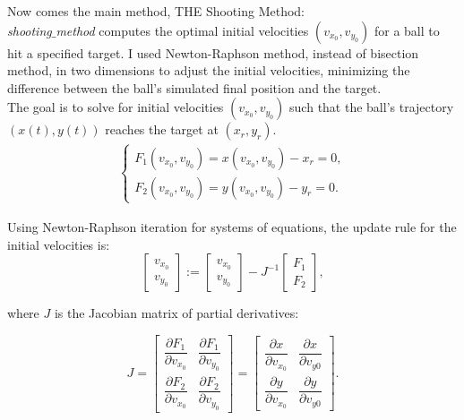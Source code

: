 \documentclass{article}
\begin{document}
	Now comes the main method, THE Shooting Method: \\
	
	\textit{shooting$\_$method} computes the optimal initial velocities $(v_{x_0}, v_{y_0})$ for a ball to hit a specified target. I used Newton-Raphson method, instead of bisection method, in two dimensions to adjust the initial velocities, minimizing the difference between the ball's simulated final position and the target. \\
	
	The goal is to solve for initial velocities $(v_{x_0}, v_{y_0})$ such that the ball's trajectory $(x(t),y(t))$ reaches the target at $(x_r, y_r)$.
	\begin{align*}
		\begin{cases}
			F_1(v_{x_0}, v_{y_0}) = x(v_{x_0}, v_{y_0}) - x_r = 0, \\
			F_2(v_{x_0}, v_{y_0}) = y(v_{x_0}, v_{y_0}) - y_r = 0.
		\end{cases}
	\end{align*}
	
	Using Newton-Raphson iteration for systems of equations, the update rule for the initial velocities is:
	\begin{equation*}
		\begin{bmatrix}
			v_{x_0} \\
			v_{y_0}
		\end{bmatrix}
		:=
		\begin{bmatrix}
			v_{x_0} \\
			v_{y_0}
		\end{bmatrix}
		- J^{-1}
		\begin{bmatrix}
			F_1 \\
			F_2
		\end{bmatrix},
	\end{equation*}
	
	where $J$ is the Jacobian matrix of partial derivatives:
	
	\begin{equation}
		J =
		\begin{bmatrix}
			\dfrac{\partial F_1}{\partial v_{x_0}} & \dfrac{\partial F_1}{\partial v_{y_0}} \\
			\dfrac{\partial F_2}{\partial v_{x_0}} & \dfrac{\partial F_2}{\partial v_{y_0}}
		\end{bmatrix}
		=
		\begin{bmatrix}
			\dfrac{\partial x}{\partial v_{x_0}} & \dfrac{\partial x}{\partial v_{y0}} \\
			\dfrac{\partial y}{\partial v_{x_0}} & \dfrac{\partial y}{\partial v_{y0}}
		\end{bmatrix}.
	\end{equation}
	
\end{document}
